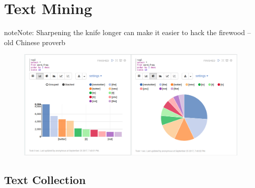 \documentclass[letterpaper,11pt,english]{sphinxmanual}
\begin{document}
\chapter{Text Mining}
\label{textmining:yassine-alouini}\label{textmining:text-mining}\label{textmining::doc}\label{textmining:textmining}
\begin{notice}{note}{Note:}
Sharpening the knife longer can make it easier to hack the firewood -- old Chinese proverb
\end{notice}
\begin{figure}[htbp]
\centering

\includegraphics{sen_word_freq.png}
\end{figure}


\section{Text Collection}
\label{textmining:text-collection}
\end{document}
